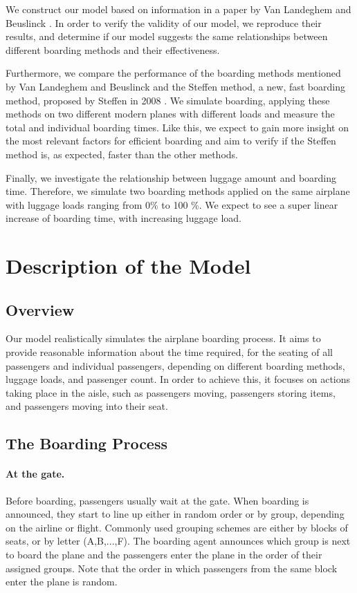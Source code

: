 \documentclass[11pt]{article}
\begin{document}
We construct our model based on information in a paper by Van Landeghem and Beuslinck \cite{beus}. In order to verify the validity of our model, we reproduce their results, and determine if our model suggests the same relationships between different boarding methods and their effectiveness.

Furthermore, we compare the performance of the boarding methods mentioned by Van Landeghem and Beuslinck and the Steffen method, a new, fast boarding method, proposed by Steffen in 2008 \cite{beus}\cite{steffen}. We simulate boarding, applying these methods on two different modern planes with different loads and measure the total and individual boarding times. Like this, we expect to gain more insight on the most relevant factors for efficient boarding and aim to verify if the Steffen method is, as expected, faster than the other methods.

Finally, we investigate the relationship between luggage amount and boarding time. Therefore, we simulate two boarding methods applied on the same airplane with luggage loads ranging from 0\% to 100 \%. We expect to see a super linear increase of boarding time, with increasing luggage load.










\section{Description of the Model}

\subsection{Overview}

Our model realistically simulates the airplane boarding process. It aims to provide reasonable information about the time required, for the seating of all passengers and individual passengers, depending on different boarding methods, luggage loads, and passenger count.  In order to achieve this, it focuses on actions taking place in the aisle, such as passengers moving, passengers storing items, and passengers moving into their seat.


\subsection{The Boarding Process}
\paragraph{At the gate.}
Before boarding, passengers usually wait at the gate. When boarding is announced, they start to line up either in random order or by group, depending on the airline or flight. Commonly used grouping schemes are either by blocks of seats, or by letter (A,B,...,F). The boarding agent announces which group is next to board the plane and the passengers enter the plane in the order of their assigned groups. Note that the order in which passengers from the same block enter the plane is random. 
\end{document}
